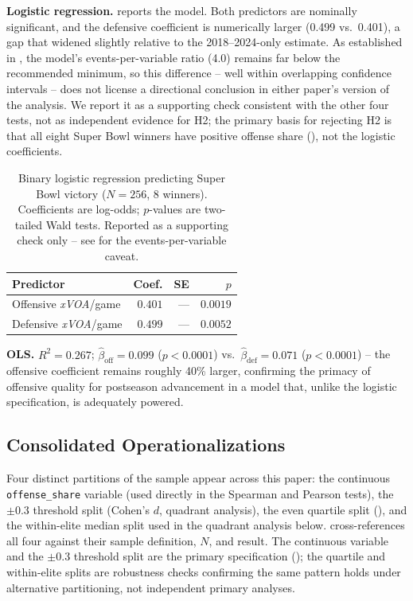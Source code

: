 \documentclass[12pt,a4paper]{article}
\newcommand{\xvoa}{\textit{xVOA}}
\begin{document}
\textbf{Logistic regression.}  reports the model. Both predictors are nominally significant, and the defensive coefficient is numerically larger (0.499 vs.\ 0.401), a gap that widened slightly relative to the 2018--2024-only estimate. As established in , the model's events-per-variable ratio (4.0) remains far below the recommended minimum, so this difference -- well within overlapping confidence intervals -- does not license a directional conclusion in either paper's version of the analysis. We report it as a supporting check consistent with the other four tests, not as independent evidence for H2; the primary basis for rejecting H2 is that all eight Super Bowl winners have positive offense share (), not the logistic coefficients.

\begin{table}[htbp]
  \centering
  \caption{Binary logistic regression predicting Super Bowl victory ($N=256$, 8 winners). Coefficients are log-odds; $p$-values are two-tailed Wald tests. Reported as a supporting check only -- see  for the events-per-variable caveat.}
  \label{tab:logistic}
  \begin{tabular}{lrrr}
    \toprule
    \textbf{Predictor} & \textbf{Coef.} & \textbf{SE} & \textbf{$p$} \\
    \midrule
    Offensive \xvoa{}/game & $0.401$ & --- & $0.0019$ \\
    Defensive \xvoa{}/game & $0.499$ & --- & $0.0052$ \\
    \bottomrule
  \end{tabular}
\end{table}

\textbf{OLS.} $R^2 = 0.267$; $\hat{\beta}_{\text{off}} = 0.099$ ($p<0.0001$) vs.\ $\hat{\beta}_{\text{def}} = 0.071$ ($p<0.0001$) -- the offensive coefficient remains roughly 40\% larger, confirming the primacy of offensive quality for postseason advancement in a model that, unlike the logistic specification, is adequately powered.

\subsection{Consolidated Operationalizations}

Four distinct partitions of the sample appear across this paper: the continuous \texttt{offense\_share} variable (used directly in the Spearman and Pearson tests), the $\pm0.3$ threshold split (Cohen's $d$, quadrant analysis), the even quartile split (), and the within-elite median split used in the quadrant analysis below.  cross-references all four against their sample definition, $N$, and result. The continuous variable and the $\pm0.3$ threshold split are the primary specification (); the quartile and within-elite splits are robustness checks confirming the same pattern holds under alternative partitioning, not independent primary analyses.
\end{document}
